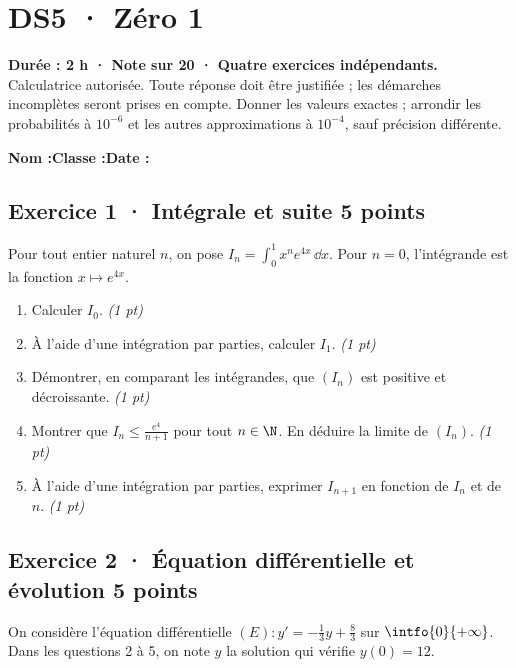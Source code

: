 \mxnewpage{}\label{sujet:7-1}

\section*{DS5 · Zéro 1}


\textbf{Durée : 2 h · Note sur 20 · Quatre exercices indépendants.}\\Calculatrice autorisée. Toute réponse doit être justifiée ; les démarches incomplètes seront prises en compte. Donner les valeurs exactes ; arrondir les probabilités à $10^{-6}$ et les autres approximations à $10^{-4}$, sauf précision différente.

\smallskip\textbf{Nom :}\enspace\dotfill\quad\textbf{Classe :}\enspace\dotfill\quad\textbf{Date :}\enspace\dotfill

\subsection*{Exercice 1 · Intégrale et suite \hfill 5 points}Pour tout entier naturel $n$, on pose $I_n=\displaystyle\int_0^1x^ne^{4x}\,\dd x$. Pour $n=0$, l'intégrande est la fonction $x\mapsto e^{4x}$.

\begin{enumerate}

\item Calculer $I_0$. \hfill\textit{(1 pt)}

\item À l'aide d'une intégration par parties, calculer $I_1$. \hfill\textit{(1 pt)}

\item Démontrer, en comparant les intégrandes, que $(I_n)$ est positive et décroissante. \hfill\textit{(1 pt)}

\item Montrer que $I_n\le\frac{e^{4}}{n+1}$ pour tout $n\in\N$. En déduire la limite de $(I_n)$. \hfill\textit{(1 pt)}

\item À l'aide d'une intégration par parties, exprimer $I_{n+1}$ en fonction de $I_n$ et de $n$. \hfill\textit{(1 pt)}

\end{enumerate}

\subsection*{Exercice 2 · Équation différentielle et évolution \hfill 5 points}On considère l'équation différentielle $(E):y'=-\frac1{3}y+\frac{8}{3}$ sur $\intfo{0}{+\infty}$. Dans les questions 2 à 5, on note $y$ la solution qui vérifie $y(0)=12$.

